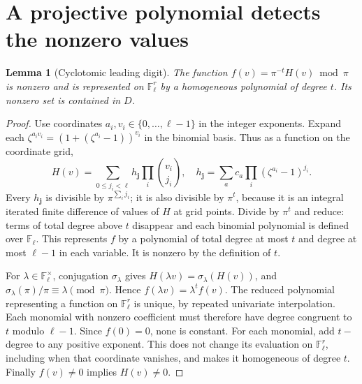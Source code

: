 \documentclass[11pt]{article}
\newtheorem{lemma}[theorem]{Lemma}
\theoremstyle{remark}\newtheorem{remark}[theorem]{Remark}
\newcommand{\F}{\mathbb F}
\begin{document}
\section{A projective polynomial detects the nonzero values}
\begin{lemma}[Cyclotomic leading digit]\label{lem:digit}
The function $f(v)=\pi^{-t}H(v)\bmod\pi$ is nonzero and is represented on $\F_\ell^r$ by a homogeneous polynomial of degree $t$. Its nonzero set is contained in $D$.
\end{lemma}
\begin{proof}
Use coordinates $a_i,v_i\in\{0,\ldots,\ell-1\}$ in the integer exponents. Expand each $\zeta^{a_i v_i}=(1+(\zeta^{a_i}-1))^{v_i}$ in the binomial basis. Thus as a function on the coordinate grid,
\[
 H(v)=\sum_{0\le j_i<\ell} h_{\boldsymbol j}\prod_i\binom{v_i}{j_i},\quad
 h_{\boldsymbol j}=\sum_a c_a\prod_i(\zeta^{a_i}-1)^{j_i}.
\]
Every $h_{\boldsymbol j}$ is divisible by $\pi^{\sum_i j_i}$; it is also divisible by $\pi^t$, because it is an integral iterated finite difference of values of $H$ at grid points. Divide by $\pi^t$ and reduce: terms of total degree above $t$ disappear and each binomial polynomial is defined over $\F_\ell$. This represents $f$ by a polynomial of total degree at most $t$ and degree at most $\ell-1$ in each variable. It is nonzero by the definition of $t$.

For $\lambda\in\F_\ell^\times$, conjugation $\sigma_\lambda$ gives $H(\lambda v)=\sigma_\lambda(H(v))$, and $\sigma_\lambda(\pi)/\pi\equiv\lambda\pmod\pi$. Hence $f(\lambda v)=\lambda^t f(v)$. The reduced polynomial representing a function on $\F_\ell^r$ is unique, by repeated univariate interpolation. Each monomial with nonzero coefficient must therefore have degree congruent to $t$ modulo $\ell-1$. Since $f(0)=0$, none is constant. For each monomial, add $t-$degree to any positive exponent. This does not change its evaluation on $\F_\ell^r$, including when that coordinate vanishes, and makes it homogeneous of degree $t$. Finally $f(v)\ne0$ implies $H(v)\ne0$.
\end{proof}
\end{document}
